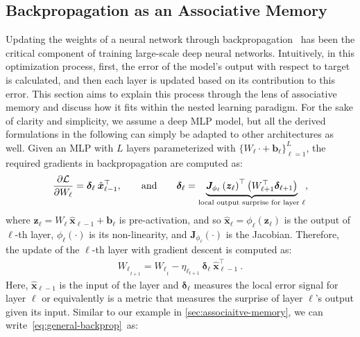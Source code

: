 \subsection{Backpropagation as an Associative Memory}\label{sec:backprop-memory-referential}
Updating the weights of a neural network through backpropagation~\citep{linnainmaa1970representation, rumelhart1986learning} has been the critical component of training large-scale deep neural networks. Intuitively, in this optimization process, first, the error of the model's output with respect to target is calculated, and then each layer is updated based on its contribution to this error. This section aims to explain this process through the lens of associative memory and discuss how it fits within the nested learning paradigm. For the sake of clarity and simplicity, we assume a deep MLP model, but all the derived formulations in the following can simply be adapted to other architectures as well. Given an MLP with $L$ layers parameterized with $\{W_{\ell} \cdot + \: \boldsymbol{b}_{\ell}\}_{\ell = 1}^{L}$, the required gradients in backpropagation are computed as:
\begin{align}\label{eq:backprop-delta-jacobian}
     \frac{\partial \mathcal{L}}{\partial W_{\ell}} = \boldsymbol{\delta}_{\ell} \: \hat{\boldsymbol{x}}_{\ell - 1}^{\top}, \qquad \text{and} \qquad \boldsymbol{\delta}_{\ell} = \underset{\text{local output surprise for layer $\ell$}}{\underbrace{\boldsymbol{J}_{\phi_\ell} \left( \boldsymbol{z}_{\ell} \right)^{\top} \left( W_{\ell+1}^{\top} \boldsymbol{\delta}_{\ell + 1} \right)}},
\end{align}
where $\boldsymbol{z}_{\ell} = W_{\ell} \:\hat{\boldsymbol{x}}_{\ell - 1} + \boldsymbol{b}_{\ell}$ is pre-activation, and so  $\hat{\boldsymbol{x}}_{\ell} = \phi_{\ell}\left( \boldsymbol{z}_{\ell}  \right)$ is the output of $\ell$-th layer, $\phi_{\ell}(\cdot)$ is its non-linearity, and $\boldsymbol{J}_{\phi_\ell}(\cdot)$ is the Jacobian. Therefore, the update of the $\ell$-th layer with gradient descent is computed as:
\begin{align}\label{eq:general-backprop}
    {W_{\ell}}_{_{t+1}} = {W_{\ell}}_{_t} - \eta_{\ell_{t+1}} \: \boldsymbol{\delta}_{\ell} \: \hat{\boldsymbol{x}}_{\ell - 1}^{\top}\:.
\end{align}
Here, $\hat{\boldsymbol{x}}_{\ell - 1}$ is the input of the layer and $\boldsymbol{\delta}_\ell$ measures the local error signal for layer $\ell$ or equivalently is a metric that measures the surprise of layer $\ell$'s output given its input. Similar to our example in \autoref{sec:associaitve-memory}, we can write~\autoref{eq:general-backprop}~as:
